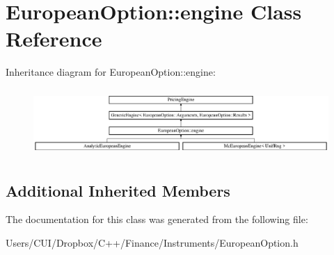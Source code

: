 \hypertarget{class_european_option_1_1engine}{}\section{European\+Option\+:\+:engine Class Reference}
\label{class_european_option_1_1engine}
Inheritance diagram for European\+Option\+:\+:engine\+:\begin{figure}[H]
\begin{center}
\leavevmode
\includegraphics[height=2.586605cm]{class_european_option_1_1engine}
\end{center}
\end{figure}
\subsection*{Additional Inherited Members}


The documentation for this class was generated from the following file\+:\begin{DoxyCompactItemize}
\item 
Users/\+C\+U\+I/\+Dropbox/\+C++/\+Finance/\+Instruments/European\+Option.\+h\end{DoxyCompactItemize}
